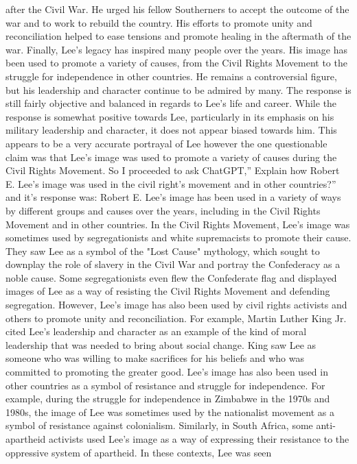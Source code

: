 \documentclass[letterpaper, 10 pt, conference]{ieeeconf}  %
\begin{document}
after the Civil War. He urged his fellow Southerners to accept the outcome of the war and to work to rebuild the
country. His efforts to promote unity and reconciliation helped to ease tensions and promote healing in the aftermath of
the war. Finally, Lee's legacy has inspired many people over the years. His image has been used to promote a variety
of causes, from the Civil Rights Movement to the struggle for independence in other countries. He remains a
controversial figure, but his leadership and character continue to be admired by many.
The response is still fairly objective and balanced in regards to Lee’s life and career. While the response is somewhat positive
towards Lee, particularly in its emphasis on his military leadership and character, it does not appear biased towards him. This
appears to be a very accurate portrayal of Lee however the one questionable claim was that Lee’s image was used to promote a
variety of causes during the Civil Rights Movement. So I proceeded to ask ChatGPT,” Explain how Robert E. Lee's image was
used in the civil right's movement and in other countries?” and it’s response was:
Robert E. Lee's image has been used in a variety of ways by different groups and causes over the years, including in the
Civil Rights Movement and in other countries. In the Civil Rights Movement, Lee's image was sometimes used by
segregationists and white supremacists to promote their cause. They saw Lee as a symbol of the "Lost Cause" mythology,
which sought to downplay the role of slavery in the Civil War and portray the Confederacy as a noble cause. Some
segregationists even flew the Confederate flag and displayed images of Lee as a way of resisting the Civil Rights
Movement and defending segregation. However, Lee's image has also been used by civil rights activists and others to
promote unity and reconciliation. For example, Martin Luther King Jr. cited Lee's leadership and character as an
example of the kind of moral leadership that was needed to bring about social change. King saw Lee as someone who
was willing to make sacrifices for his beliefs and who was committed to promoting the greater good. Lee's image has
also been used in other countries as a symbol of resistance and struggle for independence. For example, during the
struggle for independence in Zimbabwe in the 1970s and 1980s, the image of Lee was sometimes used by the nationalist
movement as a symbol of resistance against colonialism. Similarly, in South Africa, some anti-apartheid activists used
Lee's image as a way of expressing their resistance to the oppressive system of apartheid. In these contexts, Lee was seen
\end{document}
